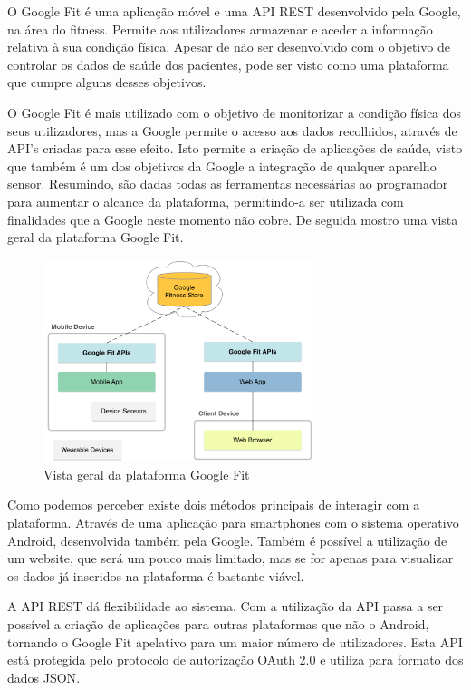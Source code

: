 O Google Fit é uma aplicação móvel e uma \gls{API} \gls{REST} desenvolvido pela Google, na área do fitness. Permite aos utilizadores armazenar e aceder a informação relativa à sua condição física. Apesar de não ser desenvolvido com o objetivo de controlar os dados de saúde dos pacientes, pode ser visto como uma plataforma que cumpre alguns desses objetivos.
\par 
O Google Fit é mais utilizado com o objetivo de monitorizar a condição física dos seus utilizadores, mas a Google permite o acesso aos dados recolhidos, através de \gls{API}’s criadas para esse efeito. Isto permite a criação de aplicações de saúde, visto que também é um dos objetivos da Google a integração de qualquer aparelho sensor. Resumindo, são dadas todas as ferramentas necessárias ao programador para aumentar o alcance da plataforma, permitindo-a ser utilizada com finalidades que a Google neste momento não cobre. 
De seguida mostro uma vista geral da plataforma Google Fit.

\begin{figure}[!ht]
  \centering
  \includegraphics[width=0.7\textwidth]{imgs/googleFitOverview.png}
  \caption[Vista geral da plataforma Google Fit]{Vista geral da plataforma Google Fit \cite{googlefit}}
  
  \label{f:googleFitOverview}
\end{figure}

Como podemos perceber existe dois métodos principais de interagir com a plataforma. Através de uma aplicação para smartphones com o sistema operativo Android, desenvolvida também pela Google.  Também é possível a utilização de um website, que será um pouco mais limitado, mas se for apenas para visualizar os dados já inseridos na plataforma é bastante viável.

A \gls{API} \gls{REST} dá flexibilidade ao sistema. Com a utilização da \gls{API} passa a ser possível a criação de aplicações para outras plataformas que não o Android, tornando o Google Fit apelativo para um maior número de utilizadores. Esta \gls{API} está protegida pelo protocolo de autorização OAuth 2.0 e utiliza para formato dos dados \gls{JSON}\cite{googlegetstarted}. 

